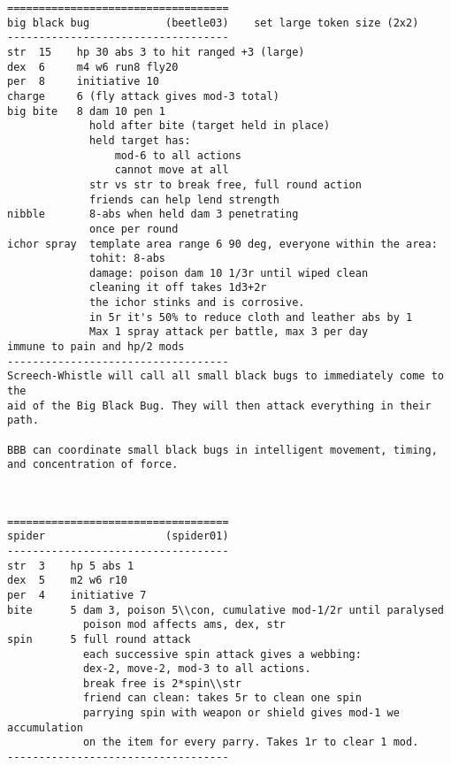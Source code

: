 \pagebreak[1]
\tiny \begin{samepage} \begin{verbatim}
===================================
big black bug            (beetle03)    set large token size (2x2)
-----------------------------------
str  15    hp 30 abs 3 to hit ranged +3 (large)
dex  6     m4 w6 run8 fly20
per  8     initiative 10
charge     6 (fly attack gives mod-3 total)
big bite   8 dam 10 pen 1
             hold after bite (target held in place)
             held target has:
                 mod-6 to all actions
                 cannot move at all
             str vs str to break free, full round action
             friends can help lend strength
nibble       8-abs when held dam 3 penetrating
             once per round
ichor spray  template area range 6 90 deg, everyone within the area:
             tohit: 8-abs
             damage: poison dam 10 1/3r until wiped clean
             cleaning it off takes 1d3+2r
             the ichor stinks and is corrosive.
             in 5r it's 50% to reduce cloth and leather abs by 1
             Max 1 spray attack per battle, max 3 per day
immune to pain and hp/2 mods
-----------------------------------
Screech-Whistle will call all small black bugs to immediately come to the
aid of the Big Black Bug. They will then attack everything in their path.

BBB can coordinate small black bugs in intelligent movement, timing,
and concentration of force.
\end{verbatim} \end{samepage} \normalsize

\

\pagebreak[1]
\tiny \begin{samepage} \begin{verbatim}
===================================
spider                   (spider01)
-----------------------------------
str  3    hp 5 abs 1
dex  5    m2 w6 r10
per  4    initiative 7
bite      5 dam 3, poison 5\\con, cumulative mod-1/2r until paralysed
            poison mod affects ams, dex, str
spin      5 full round attack
            each successive spin attack gives a webbing:
            dex-2, move-2, mod-3 to all actions.
            break free is 2*spin\\str
            friend can clean: takes 5r to clean one spin
            parrying spin with weapon or shield gives mod-1 we accumulation
            on the item for every parry. Takes 1r to clear 1 mod.
-----------------------------------
\end{verbatim} \end{samepage} \normalsize

